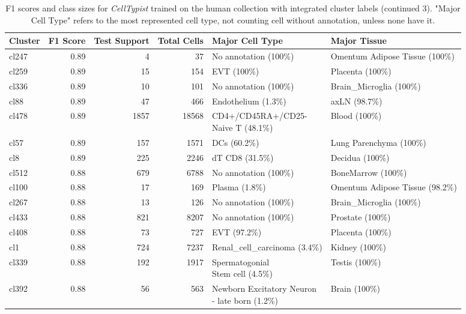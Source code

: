 \begin{table}[ht!]
\scriptsize
\caption[F1 scores and class sizes for \textit{CellTypist} trained on the human collection with integrated cluster labels (continued 3)]{F1 scores and class sizes for \textit{CellTypist} trained on the human collection with integrated cluster labels (continued 3). "Major Cell Type" refers to the most represented cell type, not counting cell without annotation, unless none have it.}
\centering
\label{table:tab_HAmodelclust3}
\begin{tabular}{lrrrll}
  \toprule
Cluster & F1 Score & Test Support & Total Cells & Major Cell Type & Major Tissue \\ 
  \midrule    
  cl247 & 0.89 &   4 &  37 & No annotation (100\%) & Omentum Adipose Tissue (100\%) \\ 
  cl259 & 0.89 &  15 & 154 & EVT (100\%) & Placenta (100\%) \\ 
  cl336 & 0.89 &  10 & 101 & No annotation (100\%) & Brain\_Microglia (100\%) \\ 
  cl88 & 0.89 &  47 & 466 & Endothelium (1.3\%) & axLN (98.7\%) \\ 
  cl478 & 0.89 & 1857 & 18568 & \specialcell[t]{CD4+/CD45RA+/CD25-\\Naive T (48.1\%)} & Blood (100\%) \\ 
  cl57 & 0.89 & 157 & 1571 & DCs (60.2\%) & Lung Parenchyma (100\%) \\ 
  cl8 & 0.89 & 225 & 2246 & dT CD8 (31.5\%) & Decidua (100\%) \\ 
  cl512 & 0.88 & 679 & 6788 & No annotation (100\%) & BoneMarrow (100\%) \\ 
  cl100 & 0.88 &  17 & 169 & Plasma (1.8\%) & Omentum Adipose Tissue (98.2\%) \\ 
  cl267 & 0.88 &  13 & 126 & No annotation (100\%) & Brain\_Microglia (100\%) \\ 
  cl433 & 0.88 & 821 & 8207 & No annotation (100\%) & Prostate (100\%) \\ 
  cl408 & 0.88 &  73 & 727 & EVT (97.2\%) & Placenta (100\%) \\ 
  cl1 & 0.88 & 724 & 7237 & Renal\_cell\_carcinoma (3.4\%) & Kidney (100\%) \\ 
  cl339 & 0.88 & 192 & 1917 & \specialcell[t]{Spermatogonial\\Stem cell (4.5\%)} & Testis (100\%) \\ 
  cl392 & 0.88 &  56 & 563 & \specialcell[t]{Newborn Excitatory Neuron\\- late born (1.2\%)} & Brain (100\%) \\ 

\end{tabular}
\end{table}
